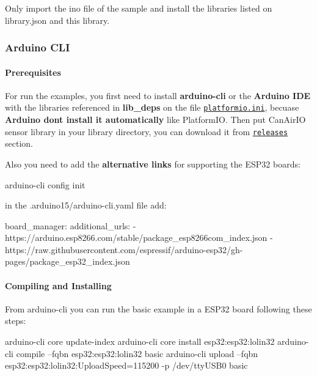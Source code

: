 Only import the {\ttfamily ino} file of the sample and install the libraries listed on {\ttfamily library.\+json} and this library.

\subsubsection*{Arduino C\+LI}

\paragraph*{Prerequisites}

For run the examples, you first need to install {\bfseries arduino-\/cli} or the {\bfseries Arduino I\+DE} with the libraries referenced in {\bfseries lib\+\_\+deps} on the file \href{https://github.com/kike-canaries/canairio_sensorlib/blob/fix_ondataready_cb/platformio.ini}{\tt platformio.\+ini}, becuase {\bfseries Arduino don\textquotesingle{}t install it automatically} like Platform\+IO. Then put Can\+Air\+IO sensor library in your library directory, you can download it from \href{https://github.com/kike-canaries/canairio_sensorlib/releases}{\tt releases} section.

Also you need to add the {\bfseries alternative links} for supporting the E\+S\+P32 boards\+:


\begin{DoxyCode}
arduino-cli config init
\end{DoxyCode}


in the {\ttfamily .arduino15/arduino-\/cli.\+yaml} file add\+:


\begin{DoxyCode}
board\_manager:
  additional\_urls:
    - https://arduino.esp8266.com/stable/package\_esp8266com\_index.json
    - https://raw.githubusercontent.com/espressif/arduino-esp32/gh-pages/package\_esp32\_index.json
\end{DoxyCode}


\paragraph*{Compiling and Installing}

From {\ttfamily arduino-\/cli} you can run the basic example in a E\+S\+P32 board following these steps\+:


\begin{DoxyCode}
arduino-cli core update-index
arduino-cli core install esp32:esp32:lolin32
arduino-cli compile --fqbn esp32:esp32:lolin32 basic
arduino-cli upload --fqbn esp32:esp32:lolin32:UploadSpeed=115200 -p /dev/ttyUSB0 basic
\end{DoxyCode}


